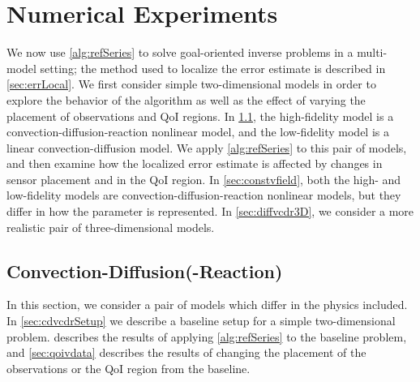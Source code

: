 \section{Numerical Experiments}\label{sec:numexp}
%
We now use \cref{alg:refSeries} to solve goal-oriented inverse problems in a multi-model setting; the method used to localize the error estimate is described in \cref{sec:errLocal}. We first consider simple two-dimensional models in order to explore the behavior of the algorithm as well as the effect of varying the placement of observations and QoI regions. In \cref{sec:cdvcdr}, the high-fidelity model is a convection-diffusion-reaction nonlinear model, and the low-fidelity model is a linear convection-diffusion model. We apply \cref{alg:refSeries} to this pair of models, and then examine how the localized error estimate is affected by changes in sensor placement and in the QoI region. In \cref{sec:constvfield}, both the high- and low-fidelity models are convection-diffusion-reaction nonlinear models, but they differ in how the parameter is represented. In \cref{sec:diffvcdr3D}, we consider a more realistic pair of three-dimensional models.


\subsection{Convection-Diffusion(-Reaction)} \label{sec:cdvcdr}
In this section, we consider a pair of models which differ in the physics included. In \cref{sec:cdvcdrSetup} we describe a baseline setup for a simple two-dimensional problem.  describes the results of applying \cref{alg:refSeries} to the baseline problem, and \cref{sec:qoivdata} describes the results of changing the placement of the observations or the QoI region from the baseline.
%
